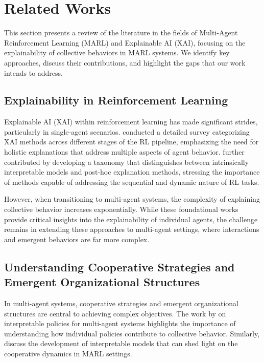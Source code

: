 \documentclass[sn-mathphys-num]{sn-jnl}%
\theoremstyle{thmstyleone}%
\theoremstyle{thmstyletwo}%
\theoremstyle{thmstylethree}%
\begin{document}
\section{Related Works}
\label{sec:related}

This section presents a review of the literature in the fields of Multi-Agent Reinforcement Learning (MARL) and Explainable AI (XAI), focusing on the explainability of collective behaviors in MARL systems. We identify key approaches, discuss their contributions, and highlight the gaps that our work intends to address.

\subsection{Explainability in Reinforcement Learning}

Explainable AI (XAI) within reinforcement learning has made significant strides, particularly in single-agent scenarios. \cite{puiutta2020explainable} conducted a detailed survey categorizing XAI methods across different stages of the RL pipeline, emphasizing the need for holistic explanations that address multiple aspects of agent behavior. \cite{heuillet2021explainable} further contributed by developing a taxonomy that distinguishes between intrinsically interpretable models and post-hoc explanation methods, stressing the importance of methods capable of addressing the sequential and dynamic nature of RL tasks.

However, when transitioning to multi-agent systems, the complexity of explaining collective behavior increases exponentially. While these foundational works provide critical insights into the explainability of individual agents, the challenge remains in extending these approaches to multi-agent settings, where interactions and emergent behaviors are far more complex.

\subsection{Understanding Cooperative Strategies and Emergent Organizational Structures}

In multi-agent systems, cooperative strategies and emergent organizational structures are central to achieving complex objectives. The work by \cite{foerster2018interpretable} on interpretable policies for multi-agent systems highlights the importance of understanding how individual policies contribute to collective behavior. Similarly, \cite{hu2020towards} discuss the development of interpretable models that can shed light on the cooperative dynamics in MARL settings.
\end{document}
